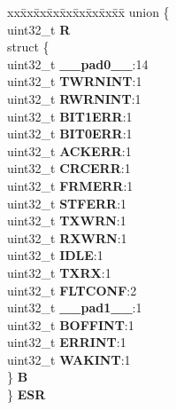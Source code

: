 \begin{DoxyCompactItemize}
\begin{tabbing}
\end{tabbing}\item 
\mbox{\label{structFLEXCAN__tag_ac766ef146cf82f4e789da18820210907}} 
\begin{tabbing}
xx\=xx\=xx\=xx\=xx\=xx\=xx\=xx\=xx\=\kill
union \{\\
\>uint32\_t {\bfseries R}\\
\>struct \{\\
\>\>uint32\_t {\bfseries \_\_pad0\_\_}:14\\
\>\>uint32\_t {\bfseries TWRNINT}:1\\
\>\>uint32\_t {\bfseries RWRNINT}:1\\
\>\>uint32\_t {\bfseries BIT1ERR}:1\\
\>\>uint32\_t {\bfseries BIT0ERR}:1\\
\>\>uint32\_t {\bfseries ACKERR}:1\\
\>\>uint32\_t {\bfseries CRCERR}:1\\
\>\>uint32\_t {\bfseries FRMERR}:1\\
\>\>uint32\_t {\bfseries STFERR}:1\\
\>\>uint32\_t {\bfseries TXWRN}:1\\
\>\>uint32\_t {\bfseries RXWRN}:1\\
\>\>uint32\_t {\bfseries IDLE}:1\\
\>\>uint32\_t {\bfseries TXRX}:1\\
\>\>uint32\_t {\bfseries FLTCONF}:2\\
\>\>uint32\_t {\bfseries \_\_pad1\_\_}:1\\
\>\>uint32\_t {\bfseries BOFFINT}:1\\
\>\>uint32\_t {\bfseries ERRINT}:1\\
\>\>uint32\_t {\bfseries WAKINT}:1\\
\>\} {\bfseries B}\\
\} {\bfseries ESR}\\


\end{tabbing}
\end{DoxyCompactItemize}
